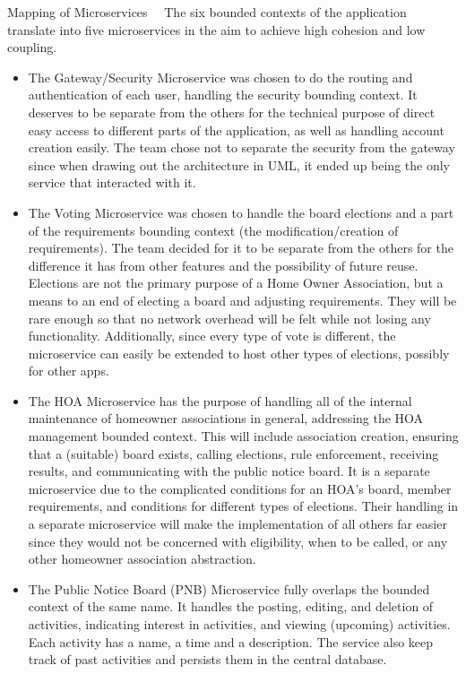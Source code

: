 \documentclass{article}
\begin{document}
\begin{section}{Mapping of Microservices }
$\quad$The six bounded contexts of the application translate into five microservices in the aim to achieve high cohesion and low coupling.
    \begin{itemize}
        \item The Gateway/Security Microservice was chosen to do the routing and authentication of each user, handling the security bounding context. It deserves to be separate from the others for the technical purpose of direct easy access to different parts of the application, as well as handling account creation easily. The team chose not to separate the security from the gateway since when drawing out the architecture in UML, it ended up being the only service that interacted with it.

        \item The Voting Microservice was chosen to handle the board elections and a part of the requirements bounding context (the modification/creation of requirements). The team decided for it to be separate from the others for the difference it has from other features and the possibility of future reuse. Elections are not the primary purpose of a Home Owner Association, but a means to an end of electing a board and adjusting requirements. They will be rare enough so that no network overhead will be felt while not losing any functionality. Additionally, since every type of vote is different, the microservice can easily be extended to host other types of elections, possibly for other apps.
        \item The HOA Microservice has the purpose of handling all of the internal maintenance of homeowner associations in general, addressing the HOA management bounded context. This will include association creation, ensuring that a (suitable) board exists, calling elections, rule enforcement, receiving results, and communicating with the public notice board. It is a separate microservice due to the complicated conditions for an HOA’s board, member requirements, and conditions for different types of elections. Their handling in a separate microservice will make the implementation of all others far easier since they would not be concerned with eligibility, when to be called, or any other homeowner association abstraction.
        \item The Public Notice Board (PNB) Microservice fully overlaps the bounded context of the same name. It handles the posting, editing, and deletion of activities, indicating interest in activities, and viewing (upcoming) activities. Each activity has a name, a time and a description. The service also keep track of past activities and persists them in the central database.

\end{itemize}
\end{section}
\end{document}
